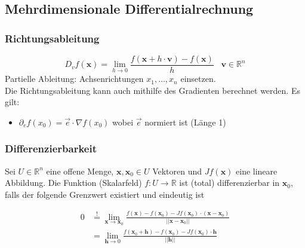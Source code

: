 \documentclass[8pt, a4paper, landscape, fleqn]{scrartcl}
\begin{document}
\begin{multicols*}{3}
			\subsection{Mehrdimensionale Differentialrechnung}	
				\subsubsection{Richtungsableitung}
					\begin{equation*}
						D_vf(\textbf{x})=\lim_{h \rightarrow 0}\frac{f(\textbf{x}+h \cdot \textbf{v})-f(\textbf{x})}{h} \hspace{10pt} \textbf{v} \in \mathbb{R}^n
					\end{equation*}	
					Partielle Ableitung: Achsenrichtungen $x_1, \dots, x_n$ einsetzen. \\
					
					Die Richtungsableitung kann auch mithilfe des Gradienten berechnet werden. Es gilt:
					\begin{itemize}
						\item $\partial_ef(x_0)=\vec{e}\cdot\nabla f(x_0)$ \hspace{10pt} wobei $\vec{e}$ normiert ist (Länge 1)
					\end{itemize}
					
				\subsubsection{Differenzierbarkeit}
					Sei $U \in \mathbb{R}^n$ eine offene Menge, $\textbf{x}, \textbf{x}_0 \in U$ Vektoren und $Jf(\textbf{x})$ eine lineare Abbildung. Die Funktion (Skalarfeld) $f: U \rightarrow \mathbb{R}$ ist (total) differenzierbar in $\textbf{x}_0$, falls der folgende Grenzwert existiert und eindeutig ist
			
					\begin{align*}
						0 &\overset{!}{=} \lim_{\textbf{x} \rightarrow \textbf{x}_0} \frac{f(\textbf{x})-f(\textbf{x}_0)-Jf(\textbf{x}_0) \cdot (\textbf{x}-\textbf{x}_0)}{\vert \vert \textbf{x}-\textbf{x}_0 \vert \vert}\\
						&= \lim_{\textbf{h} \rightarrow 0} \frac{f(\textbf{x}_0+\textbf{h})-f(\textbf{x}_0)-Jf(\textbf{x}_0)\cdot \textbf{h}}{\vert \vert \textbf{h} \vert \vert} 
					\end{align*}
			

\end{multicols*}
\end{document}
